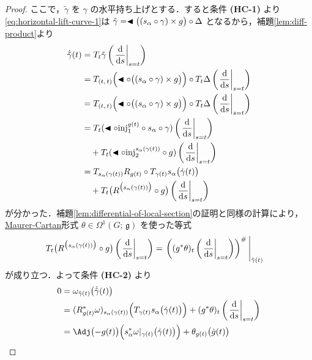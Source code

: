 \documentclass[TQFT_main]{subfiles}
\begin{document}
\begin{proof}
    ここで，$\tilde{\gamma}$ を $\gamma$ の水平持ち上げとする．すると条件 \textsf{\textbf{(HC-1)}} より\eqref{eq:horizontal-lift-curve-1}は $\tilde{\gamma} =  \blacktriangleleft \bigl( (s_\alpha \circ \gamma) \times g \bigr) \circ \Delta$ となるから，補題\ref{lem:diff-product}より
    \begin{align}
        \dot{\tilde{\gamma}}(t) 
        &= T_t \tilde{\gamma} \left( \eval{\dv{}{s}}_{s=t} \right) \\
        &= T_{(t,\, t)}\Bigl(\btl \circ \bigl( (s_\alpha \circ \gamma) \times g \bigr) \Bigr)\circ T_t \Delta \left( \eval{\dv{}{s}}_{s=t} \right) \\
        &= T_{(t,\, t)}\Bigl(\btl \circ \bigl( (s_\alpha \circ \gamma) \times g \bigr) \Bigr)\circ T_t \Delta \left( \eval{\dv{}{s}}_{s=t} \right) \\
        &= T_{t}(\btl \circ \mathrm{inj}_1^{g(t)} \circ s_\alpha \circ \gamma) \left( \eval{\dv{}{s}}_{s=t} \right) \\
        &\quad + T_{t}(\btl \circ \mathrm{inj}_2^{s_\alpha (\gamma(t))} \circ g) \left( \eval{\dv{}{s}}_{s=t} \right) \\
        &= T_{s_\alpha(\gamma(t))} R_{g(t)} \circ T_{\gamma(t)}s_\alpha \bigl(\dot{\gamma}(t)\bigr) \\
        &\quad + T_{t} \bigl(R^{\bigl( s_\alpha(\gamma(t)) \bigr)} \circ g\bigr) \left( \eval{\dv{}{s}}_{s=t} \right) \label{eq:horizontal-lift-curve-4}
    \end{align}
    が分かった．補題\ref{lem:differential-of-local-section}の証明と同様の計算により，\hyperref[def:Maurer-Cartan]{Maurer-Cartan}形式 $\theta \in \Omega^1(G;\, \mathfrak{g})$ を使った等式
    \begin{align}
        T_{t} \bigl(R^{\bigl( s_\alpha(\gamma(t)) \bigr)} \circ g\bigr) \left( \eval{\dv{}{s}}_{s=t} \right) 
        &= \eval{\left( (g^* \theta)_t \left( \eval{\dv{}{s}}_{s=t} \right) \right)^\#}_{\tilde{\gamma}(t)}
    \end{align}
    が成り立つ．よって条件 \textsf{\textbf{(HC-2)}} より
    \begin{align}
        0 
        &= \omega_{\tilde{\gamma}(t)} \bigl( \dot{\tilde{\gamma}} (t) \bigr) \\
        &= (R_{g(t)}^* \omega)_{s_\alpha(\gamma(t))} \Bigl( T_{\gamma(t)}s_\alpha \bigl(\dot{\gamma}(t)\bigr) \Bigr) + (g^* \theta)_t \left( \eval{\dv{}{s}}_{s=t} \right) \\
        &= \Adj \bigl( -g(t) \bigr) \Bigl( s_\alpha^* \omega|_{\gamma(t)}\bigl(\dot{\gamma}(t)\bigr) \Bigr) + \theta_{g(t)} \bigl( \dot{g}(t) \bigr) \label{eq:horizontal-lift-curve-2}

\end{align}
\end{proof}
\end{document}
